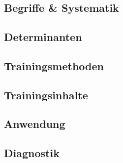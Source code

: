 \section{}

\subsection{Begriffe \& Systematik}

\subsection{Determinanten}

\subsection{Trainingsmethoden}

\subsection{Trainingsinhalte}

\subsection{Anwendung}

\subsection{Diagnostik}

